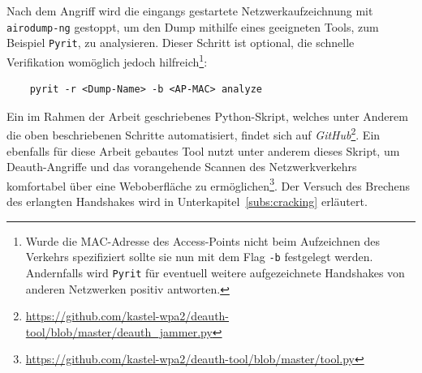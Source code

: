 Nach dem Angriff wird die eingangs gestartete Netzwerkaufzeichnung mit \texttt{airodump-ng} gestoppt, um den Dump mithilfe eines geeigneten Tools, zum Beispiel \texttt{Pyrit}, zu analysieren. Dieser Schritt ist optional, die schnelle Verifikation womöglich jedoch hilfreich\footnote{Wurde die MAC-Adresse des Access-Points nicht beim Aufzeichnen des Verkehrs spezifiziert sollte sie nun mit dem Flag \texttt{-b} festgelegt werden.
Andernfalls wird \texttt{Pyrit} für eventuell weitere aufgezeichnete Handshakes von anderen Netzwerken positiv antworten.}: 
\begin{Verbatim}
	pyrit -r <Dump-Name> -b <AP-MAC> analyze
\end{Verbatim}
Ein im Rahmen der Arbeit geschriebenes Python-Skript, welches unter Anderem die oben beschriebenen Schritte automatisiert, findet sich auf \textit{GitHub}\footnote{\href{https://github.com/kastel-wpa2/deauth-tool/blob/master/deauth_jammer.py}{https://github.com/kastel-wpa2/deauth-tool/blob/master/deauth\_jammer.py}}. Ein ebenfalls für diese Arbeit gebautes Tool nutzt unter anderem dieses Skript, um Deauth-Angriffe und das vorangehende Scannen des Netzwerkverkehrs komfortabel über eine Weboberfläche zu ermöglichen\footnote{\href{https://github.com/kastel-wpa2/deauth-tool/blob/master/tool.py}{https://github.com/kastel-wpa2/deauth-tool/blob/master/tool.py}}.
Der Versuch des Brechens des erlangten Handshakes wird in Unterkapitel~\ref{subs:cracking} erläutert.

